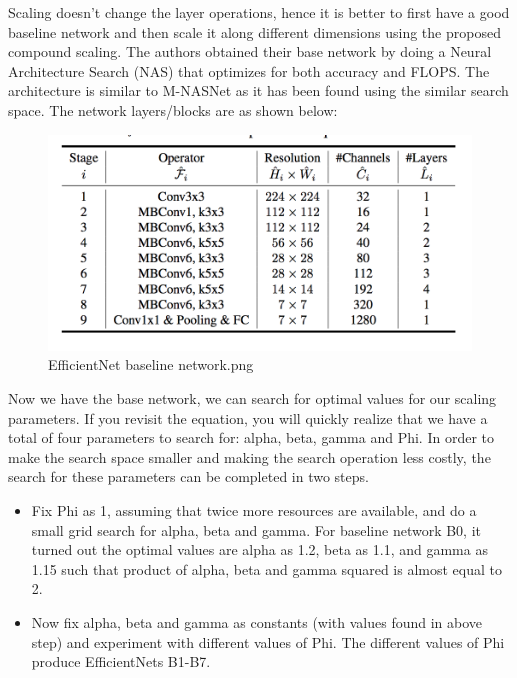 Scaling doesn’t change the layer operations, hence it is better to first have a good baseline network and then scale it along different dimensions using the proposed compound scaling. The authors obtained their base network by doing a Neural Architecture Search (NAS) that optimizes for both accuracy and FLOPS. The architecture is similar to M-NASNet as it has been found using the similar search space. The network layers/blocks are as shown below:
\begin{figure}[htpb]
\centering
\includegraphics[width=\textwidth,height=\textheight,keepaspectratio]{../../static/EfficientNet baseline network.png}
\caption{EfficientNet baseline network.png}
\end{figure}Now we have the base network, we can search for optimal values for our scaling parameters. If you revisit the equation, you will quickly realize that we have a total of four parameters to search for: alpha, beta, gamma and Phi. In order to make the search space smaller and making the search operation less costly, the search for these parameters can be completed in two steps.

\begin{itemize}
\item Fix Phi as 1, assuming that twice more resources are available, and do a small grid search for alpha, beta and gamma. For baseline network B0, it turned out the optimal values are alpha as 1.2, beta as 1.1, and gamma as 1.15 such that product of alpha, beta and gamma squared is almost equal to 2.
\item Now fix alpha, beta and gamma as constants (with values found in above step) and experiment with different values of Phi. The different values of Phi produce EfficientNets B1-B7.

\end{itemize}